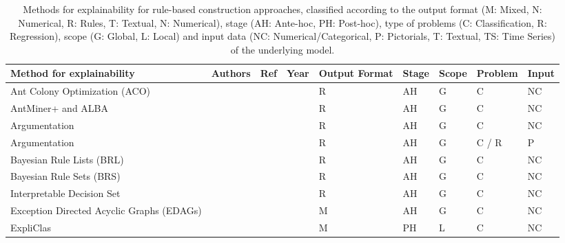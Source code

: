 \documentclass[final,1p,times]{elsarticle}
\begin{document}
\begin{table}[htbp]
\footnotesize
    \caption{Methods for explainability for rule-based construction approaches, classified according to the output format (M: Mixed, N: Numerical, R: Rules, T: Textual, N: Numerical), stage (AH: Ante-hoc, PH: Post-hoc), type of problems (C: Classification, R: Regression), scope (G: Global, L: Local) and input data (NC: Numerical/Categorical, P: Pictorials, T: Textual, TS: Time Series) of the underlying model.}
    \label{tab:rule-based}
    \begin{tabular}{m{3.5cm} m{2cm} m{0.5cm} m{0.5cm} m{0.85cm} m{0.5cm} m{0.6cm} m{0.8cm} m{0.6cm}}
    \hline
    Method for explainability & Authors & Ref & Year & Output Format & Stage & Scope & Problem & Input\\
    \hline
    Ant Colony Optimization (ACO) &  \citeauthor{otero2016improving} &  \cite{otero2016improving} &  \citeyear{otero2016improving} & R & AH & G & C & NC\\
    AntMiner+ and ALBA &  \citeauthor{verbeke2011building} &  \cite{verbeke2011building} &  \citeyear{verbeke2011building} & R & AH & G & C & NC\\
    Argumentation &  \citeauthor{rizzo2019inferential} &  \cite{rizzo2019inferential,rizzo2018qualitative} &  \citeyear{rizzo2019inferential} & R & AH & G & C & NC\\
    Argumentation &  \citeauthor{zeng2018building} &  \cite{zeng2018building} &  \citeyear{zeng2018building} & R & AH & G & C / R & P\\
    Bayesian Rule Lists (BRL) &  \citeauthor{letham2012building} &  \cite{letham2012building,letham2013interpretable,letham2015interpretable} &  \citeyear{letham2012building,letham2013interpretable,letham2015interpretable} & R & AH & G & C & NC\\
    Bayesian Rule Sets (BRS) &  \citeauthor{wang2016bayesian} &  \cite{wang2016bayesian,wang2017bayesian} &  \citeyear{wang2016bayesian,wang2017bayesian} & R & AH & G & C & NC\\
    Interpretable Decision Set &  \citeauthor{lakkaraju2016interpretable} &  \cite{lakkaraju2016interpretable} &  \citeyear{lakkaraju2016interpretable} & R & AH & G & C & NC\\
    Exception Directed Acyclic Graphs (EDAGs) &  \citeauthor{gaines1996transforming} &  \cite{gaines1996transforming} &  \citeyear{gaines1996transforming} & M & AH & G & C & NC\\
    ExpliClas &  \citeauthor{alonso2019explainable} &  \cite{alonso2019explainable} &  \citeyear{alonso2019explainable} & M & PH & L & C & NC\\

\end{tabular}
\end{table}
\end{document}

